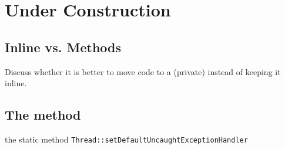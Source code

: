 



\isodate












\part*{Under Construction}


\chapter{Inline vs. Methods}\label{sec:InlineVsMethods}
Discuss whether it is better to move code to a (private) instead of keeping it inline.






\chapter{The method }\label{sec:MethodMain}

the static method \lstinline|Thread::setDefaultUncaughtExceptionHandler| \autocite{ORACLE_DOC_THREAD:setDefaultUncaughtExceptionHandler}


